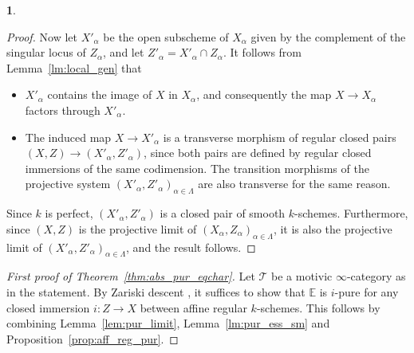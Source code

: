 \documentclass[11pt]{article}
\numberwithin{equation}{section}\renewcommand{\encodingdefault}{TU}
\newcommand{\T}{\mathscr T}
\newcommand{\E}{\mathbb E}
\theoremstyle{remark}
\theoremstyle{definition}
\newtheorem{num}[thm]{}
\numberwithin{equation}{thm}
\begin{document}
\begin{num}
\begin{proof}
Now let $X'_\alpha$ be the open subscheme of $X_\alpha$ given by the complement of the singular locus of $Z_\alpha$, and let $Z'_\alpha=X'_\alpha\cap Z_\alpha$. It follows from Lemma~\ref{lm:local_gen} that
\begin{itemize}
\item $X'_\alpha$ contains the image of $X$ in $X_\alpha$, and consequently the map $X\to X_\alpha$ factors through $X'_\alpha$.
\item The induced map $X\to X'_\alpha$ is a transverse morphism of regular closed pairs $(X,Z)\to (X'_\alpha,Z'_\alpha)$, since both pairs are defined by regular closed immersions of the same codimension. The transition morphisms of the projective system $(X'_\alpha,Z'_\alpha)_{\alpha\in\Lambda}$ are also transverse for the same reason.
\end{itemize}
Since $k$ is perfect, $(X'_\alpha,Z'_\alpha)$ is a closed pair of smooth $k$-schemes. Furthermore, since $(X,Z)$ is the projective limit of $(X_\alpha,Z_\alpha)_{\alpha\in\Lambda}$, it is also the projective limit of $(X'_\alpha,Z'_\alpha)_{\alpha\in\Lambda}$, and the result follows.
\end{proof}

\begin{proof}[First proof of Theorem~\ref{thm:abs_pur_eqchar}]
Let $\T$ be a motivic $\infty$-category as in the statement.
By Zariski descent \cite[Prop.\,3.3.4]{CD3}, it suffices to show that $\E$ is $i$-pure for any closed immersion $i:Z\to X$ between affine regular $k$-schemes. This follows by combining Lemma~\ref{lem:pur_limit}, Lemma~\ref{lm:pur_ess_sm} and Proposition~\ref{prop:aff_reg_pur}.
\end{proof}
\end{num}
\end{document}
